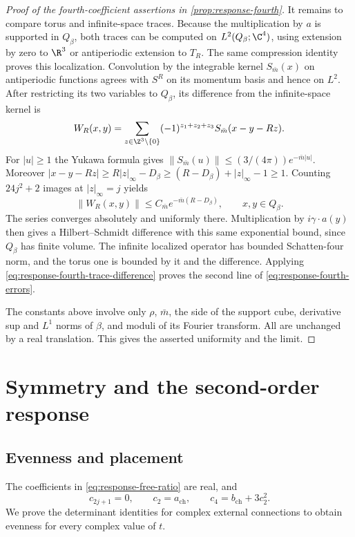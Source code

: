 \documentclass[11pt,letterpaper,reqno]{amsart}
\begin{document}
\begin{proof}[Proof of the fourth-coefficient assertions in \cref{prop:response-fourth}]
It remains to compare torus and infinite-space traces.
Because the multiplication by $a$ is supported in
$Q_\beta$, both traces can be computed on $L^2(Q_\beta;\C^4)$,
using extension by zero to $\R^3$ or antiperiodic extension
to $T_R$. The same compression identity proves this
localization. Convolution by the integrable kernel
$S_{\bar m}(x)$ on antiperiodic functions agrees with
$S^R$ on its momentum basis and hence on $L^2$.
After restricting its two variables to $Q_\beta$, its
difference from the infinite-space kernel is
\[
 W_R(x,y)=\sum_{z\in\Z^3\setminus\{0\}}
                  (-1)^{z_1+z_2+z_3}S_{\bar m}(x-y-Rz).
\]
For $|u|\ge1$ the Yukawa formula gives
$\|S_{\bar m}(u)\|\le(3/(4\pi))e^{-\bar m|u|}$.
Moreover $|x-y-Rz|\ge R|z|_\infty-D_\beta\ge
(R-D_\beta)+|z|_\infty-1\ge1$. Counting
$24j^2+2$ images at $|z|_\infty=j$ yields
\[
 \|W_R(x,y)\|\le C_{\bar m}e^{-\bar m(R-D_\beta)},
 \qquad x,y\in Q_\beta.
\]
The series converges absolutely and uniformly there.
Multiplication by $i\gamma\cdot a(y)$ then gives a
Hilbert--Schmidt difference with this same exponential
bound, since $Q_\beta$ has finite volume. The infinite
localized operator has bounded Schatten-four norm,
and the torus one is bounded by it and the difference.
Applying \eqref{eq:response-fourth-trace-difference}
proves the second line of \eqref{eq:response-fourth-errors}.

The constants above involve only $\rho$, $\bar m$,
the side of the support cube, derivative sup and
$L^1$ norms of $\beta$, and moduli of its Fourier
transform. All are unchanged by a real translation.
This gives the asserted uniformity and the limit.
\end{proof}

\section{Symmetry and the second-order response}\label{subsec:response-symmetry}

\subsection{Evenness and placement}

The coefficients in \eqref{eq:response-free-ratio} are real, and
\begin{equation}\label{eq:response-coefficient-relations}
 c_{2j+1}=0,\qquad c_2=a_{\mathrm{ch}},\qquad
                 c_4=b_{\mathrm{ch}}+3c_2^2.
\end{equation}
We prove the determinant identities for complex external connections
to obtain evenness for every complex value of $t$.
\end{document}
